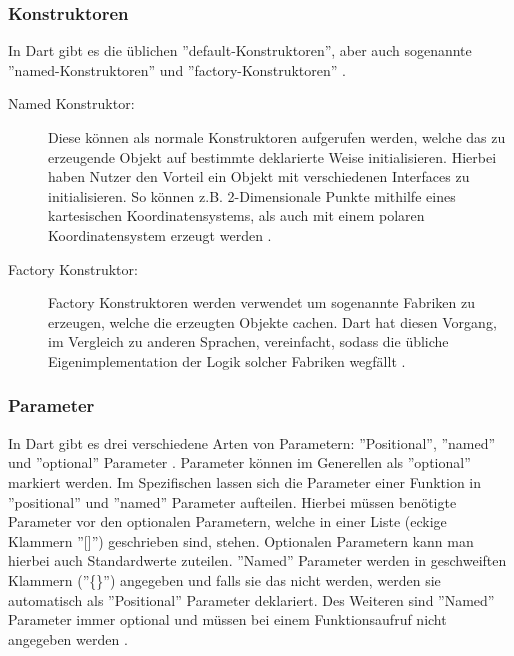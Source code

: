     \subsubsection{Konstruktoren}
    \label{subsubsec:Dart:Klassen:Konstruktoren}
    In Dart gibt es die üblichen ''default-Konstruktoren'', aber auch sogenannte ''named-Konstruktoren'' und ''factory-Konstruktoren'' \cite{book:Dart:StartGuideDart_SanjibSinha, book:Dart:DPL_GiladBracha}.
    \begin{description}
        \item[Named Konstruktor:]
            Diese können als normale Konstruktoren aufgerufen werden, welche das zu erzeugende Objekt auf bestimmte deklarierte Weise initialisieren. Hierbei haben Nutzer den Vorteil ein Objekt mit verschiedenen Interfaces zu initialisieren. So können z.B. 2-Dimensionale Punkte mithilfe eines kartesischen Koordinatensystems, als auch mit einem polaren Koordinatensystem erzeugt werden \cite{book:Dart:DPL_GiladBracha}.
        \item[Factory Konstruktor:] 
            Factory Konstruktoren werden verwendet um sogenannte Fabriken zu erzeugen, welche die erzeugten Objekte cachen. Dart hat diesen Vorgang, im Vergleich zu anderen Sprachen, vereinfacht, sodass die übliche Eigenimplementation der Logik solcher Fabriken wegfällt \cite{book:Dart:DPL_GiladBracha}.
    \end{description}

    \subsubsection{Parameter}
    \label{subsubsec:Dart:Klassen:Parameter}
    In Dart gibt es drei verschiedene Arten von Parametern: ''Positional'', ''named'' und ''optional'' Parameter \cite{book:Dart:StartGuideDart_SanjibSinha}.
    Parameter können im Generellen als ''optional'' markiert werden. Im Spezifischen lassen sich die Parameter einer Funktion in ''positional'' und ''named'' Parameter aufteilen. Hierbei müssen benötigte Parameter vor den optionalen Parametern, welche in einer Liste (eckige Klammern ''[]'') geschrieben sind, stehen. Optionalen Parametern kann man hierbei auch Standardwerte zuteilen. ''Named'' Parameter werden in geschweiften Klammern (''\{\}'') angegeben und falls sie das nicht werden, werden sie automatisch als ''Positional'' Parameter deklariert. Des Weiteren sind ''Named'' Parameter immer optional und müssen bei einem Funktionsaufruf nicht angegeben werden \cite{book:Dart:DPL_GiladBracha}.

